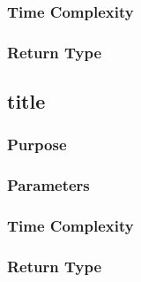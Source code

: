 \documentclass{article}
\begin{document}
			\subsubsection{Time Complexity}
			
			\subsubsection{Return Type}
			
		\newpage
		
		\subsection{title}	
			\subsubsection{Purpose}
			
			\subsubsection{Parameters}
			
			\subsubsection{Time Complexity}
			
			\subsubsection{Return Type}
			
		
\end{document}
